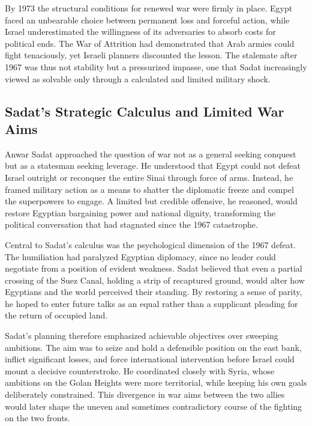By 1973 the structural conditions for renewed war were firmly in place. Egypt faced an unbearable choice between permanent loss and forceful action, while Israel underestimated the willingness of its adversaries to absorb costs for political ends. The War of Attrition had demonstrated that Arab armies could fight tenaciously, yet Israeli planners discounted the lesson. The stalemate after 1967 was thus not stability but a pressurized impasse, one that Sadat increasingly viewed as solvable only through a calculated and limited military shock. \cite{bregman2002} \cite{siniver2013} \cite{sadat1978}

\subsection{Sadat's Strategic Calculus and Limited War Aims}
Anwar Sadat approached the question of war not as a general seeking conquest but as a statesman seeking leverage. He understood that Egypt could not defeat Israel outright or reconquer the entire Sinai through force of arms. Instead, he framed military action as a means to shatter the diplomatic freeze and compel the superpowers to engage. A limited but credible offensive, he reasoned, would restore Egyptian bargaining power and national dignity, transforming the political conversation that had stagnated since the 1967 catastrophe.

Central to Sadat's calculus was the psychological dimension of the 1967 defeat. The humiliation had paralyzed Egyptian diplomacy, since no leader could negotiate from a position of evident weakness. Sadat believed that even a partial crossing of the Suez Canal, holding a strip of recaptured ground, would alter how Egyptians and the world perceived their standing. By restoring a sense of parity, he hoped to enter future talks as an equal rather than a supplicant pleading for the return of occupied land.

Sadat's planning therefore emphasized achievable objectives over sweeping ambitions. The aim was to seize and hold a defensible position on the east bank, inflict significant losses, and force international intervention before Israel could mount a decisive counterstroke. He coordinated closely with Syria, whose ambitions on the Golan Heights were more territorial, while keeping his own goals deliberately constrained. This divergence in war aims between the two allies would later shape the uneven and sometimes contradictory course of the fighting on the two fronts.

